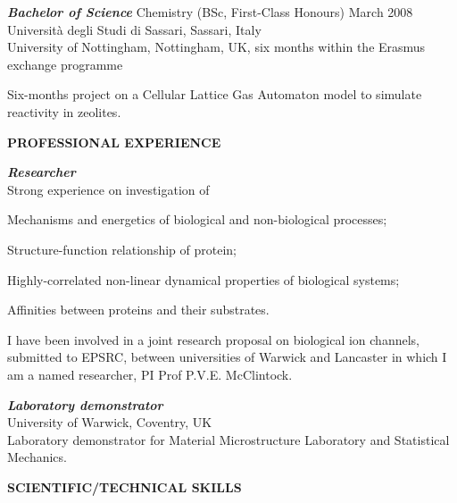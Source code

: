 \documentclass[a4paper,10pt,final]{memoir}
\newcommand{\Sep}{\vspace{1em}}
\newcommand{\SmallSep}{\vspace{0.4em}}
\newcommand{\CVSection}[1]
	{\Large\textbf{#1}\par
	\SmallSep\normalsize\normalfont}
\newcommand{\CVItem}[2]
	{\textit{\textbf{\color{RoyalBlue} #1}} #2}
\begin{document}
\CVItem{Bachelor of Science}{Chemistry (BSc, First-Class Honours) \hfill  March 2008}\\
Universit\`a degli Studi di Sassari, Sassari, Italy\\
University of Nottingham, Nottingham, UK, six months within the Erasmus exchange programme  %
\begin{description}[style=multiline,leftmargin=2.6cm,font=\normalfont,topsep=0.1cm,,itemsep=-3.5pt]
\item [Final project:] Six-months project on a Cellular Lattice Gas Automaton model to simulate
  reactivity in zeolites.
\end{description}


\Sep
\CVSection{PROFESSIONAL EXPERIENCE}
\CVItem{Researcher} \\
Strong experience on investigation of 
\begin{compactitem}[\color{RoyalBlue}$\circ$] 
\item Mechanisms and energetics of biological and non-biological processes;
\item Structure-function relationship of protein;
\item Highly-correlated non-linear dynamical properties of biological systems;
\item Affinities between proteins and their substrates.
\end{compactitem}

I have been involved in a joint research proposal on biological ion channels, submitted to
EPSRC, between universities of Warwick and Lancaster in which I am a named researcher, PI
Prof P.V.E. McClintock.

\SmallSep
\CVItem{Laboratory demonstrator} \\ %
University of Warwick, Coventry, UK  \\
Laboratory demonstrator for Material Microstructure Laboratory and Statistical Mechanics. 


\Sep
\CVSection{SCIENTIFIC/TECHNICAL SKILLS}
\end{document}
